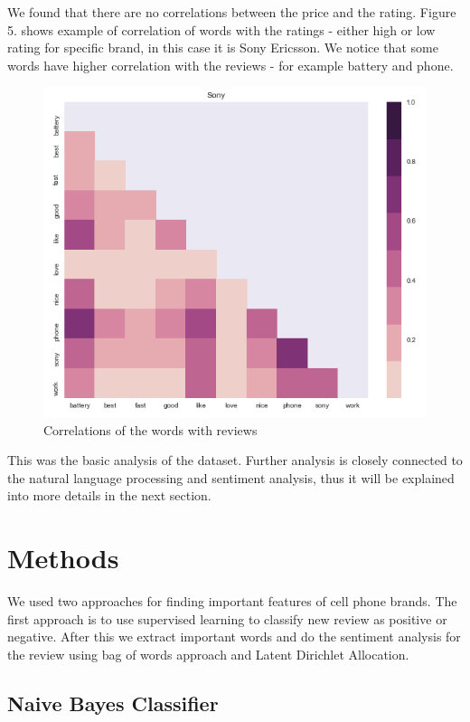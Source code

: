 \documentclass[11pt]{article}
\begin{document}
We found that there are no correlations between the price and the rating. Figure 5. shows example of correlation of words with the ratings - either high or low rating for specific brand, in this case it is Sony Ericsson. We notice that some words have higher correlation with the reviews - for example battery and phone. 


\begin{figure}[h!]
  \centering
    \includegraphics[width=\linewidth]{correlations.png}
  \caption{Correlations of the words with reviews}
  \label{fig:correlations}
\end{figure}

This was the basic analysis of the dataset. Further analysis is closely connected to the natural language processing and sentiment analysis, thus it will be explained into more details in the next section. 


\section{Methods}
We used two approaches for finding important features of cell phone brands. The first approach is to use supervised learning to classify new review as positive or negative. After this we extract important words and do the sentiment analysis for the review using bag of words approach and Latent Dirichlet Allocation.


\subsection{Naive Bayes Classifier}
\end{document}

